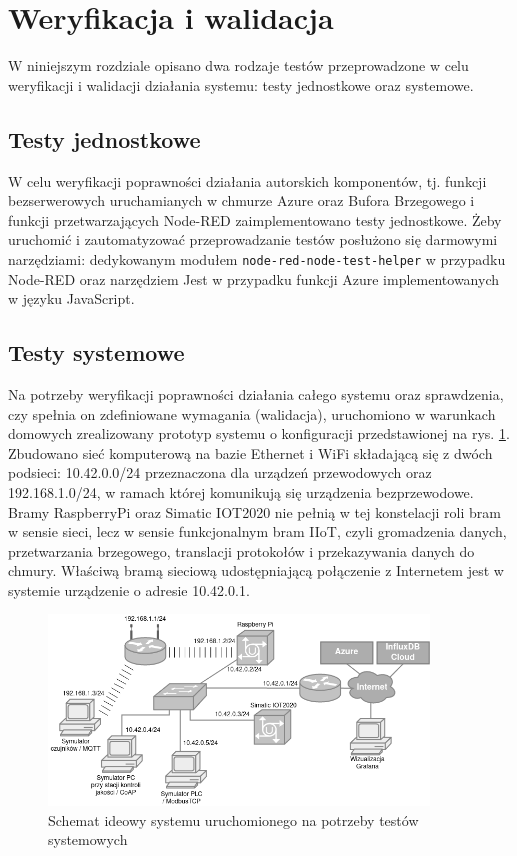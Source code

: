 \documentclass[a4paper, 12pt, twoside]{article}
\begin{document}
\newpage
\section{Weryfikacja i walidacja}\label{testy}

W niniejszym rozdziale opisano dwa rodzaje testów przeprowadzone 
w celu weryfikacji i walidacji działania systemu: testy jednostkowe oraz systemowe.

\subsection{Testy jednostkowe}

W celu weryfikacji poprawności działania autorskich komponentów, tj.
funkcji bezserwerowych uruchamianych w chmurze Azure oraz Bufora Brzegowego i funkcji przetwarzających Node-RED
zaimplementowano testy jednostkowe. Żeby uruchomić i zautomatyzować przeprowadzanie
testów posłużono się darmowymi narzędziami: dedykowanym modułem \texttt{node-red-node-test-helper}
w przypadku Node-RED oraz narzędziem Jest w przypadku funkcji Azure implementowanych
w języku JavaScript.

\subsection{Testy systemowe}\label{testy-systemowe}

Na potrzeby weryfikacji poprawności działania całego systemu oraz sprawdzenia,
czy spełnia on zdefiniowane wymagania (walidacja), uruchomiono w warunkach
domowych zrealizowany prototyp systemu o konfiguracji przedstawionej na rys. \ref{fig:network}.
Zbudowano sieć komputerową na bazie Ethernet i WiFi składającą się z dwóch
podsieci: 10.42.0.0/24 przeznaczona dla urządzeń przewodowych oraz
192.168.1.0/24, w ramach której komunikują się urządzenia bezprzewodowe.
Bramy RaspberryPi oraz Simatic IOT2020 nie pełnią w tej konstelacji roli
bram w sensie sieci, lecz w sensie funkcjonalnym bram IIoT, czyli gromadzenia danych, przetwarzania
brzegowego, translacji protokołów i przekazywania danych do chmury.
Właściwą bramą sieciową udostępniającą połączenie z Internetem jest w systemie urządzenie o adresie 10.42.0.1.

\begin{figure}[h]
      \centering
      \includegraphics[width=0.9\textwidth]{network.png}
      \caption{Schemat ideowy systemu uruchomionego na potrzeby testów systemowych}
      \label{fig:network}
\end{figure}
\end{document}
